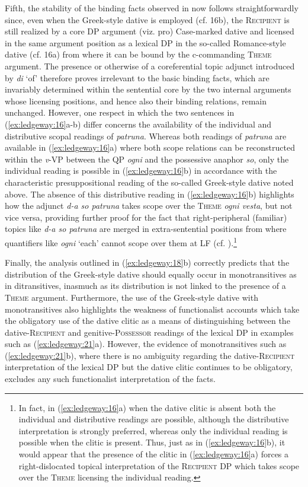 \documentclass[output=paper,modfonts,nonflat,colorlinks,citecolor=brown]{langsci/langscibook}
\begin{document}
  Fifth, the stability of the binding facts observed in  now follows straightforwardly since, even when the Greek-style dative is employed (cf. 16b), the \textsc{Recipient} is still realized by a core DP argument (viz. pro) Case-marked dative and licensed in the same argument position as a lexical DP in the so-called Romance-style dative (cf. 16a) from where it can be bound by the c-commanding \textsc{Theme} argument. The presence or otherwise of a coreferential topic adjunct introduced by \textit{di} ‘of’ therefore proves irrelevant to the basic binding facts, which are invariably determined within the sentential core by the two internal arguments whose licensing positions, and hence also their binding relations, remain unchanged. However, one respect in which the two sentences in (\ref{ex:ledgeway:16}a-b) differ concerns the availability of the individual and distributive scopal readings of \textit{patruna}. Whereas both readings of \textit{patruna} are available in (\ref{ex:ledgeway:16}a) where both scope relations can be reconstructed within the \textit{v}{}-VP between the QP \textit{ogni} and the possessive anaphor \textit{so}, only the individual reading is possible in (\ref{ex:ledgeway:16}b) in accordance with the characteristic presuppositional reading of the so-called Greek-style dative noted above. The absence of this distributive reading in (\ref{ex:ledgeway:16}b) highlights how the adjunct \textit{d-a so patruna} takes scope over the \textsc{Theme} \textit{ogni vesta}, but not vice versa, providing further proof for the fact that right-peripheral (familiar) topics like \textit{d-a so patruna} are merged in extra-sentential positions from where quantifiers like \textit{ogni} ‘each’ cannot scope over them at LF (cf. \citealt{Cardinaletti2002, Frascarelli2004, FrascarelliHinterhölzl2007}).\footnote{In fact, in (\ref{ex:ledgeway:16}a) when the dative clitic is absent both the individual and distributive readings are possible, although the distributive interpretation is strongly preferred, whereas only the individual reading is possible when the clitic is present. Thus, just as in (\ref{ex:ledgeway:16}b), it would appear that the presence of the clitic in (\ref{ex:ledgeway:16}a) forces a right-dislocated topical interpretation of the \textsc{Recipient} DP which takes scope over the \textsc{Theme} licensing the individual reading.}

  Finally, the analysis outlined in (\ref{ex:ledgeway:18}b) correctly predicts that the distribution of the Greek-style dative should equally occur in monotransitives as in ditransitives, inasmuch as its distribution is not linked to the presence of a \textsc{Theme} argument. Furthermore, the use of the Greek-style dative with monotransitives also highlights the weakness of functionalist accounts which take the obligatory use of the dative clitic as a means of distinguishing between the dative-\textsc{Recipient} and genitive-\textsc{Possessor} readings of the lexical DP in examples such as (\ref{ex:ledgeway:21}a). However, the evidence of monotransitives such as (\ref{ex:ledgeway:21}b), where there is no ambiguity regarding the dative-\textsc{Recipient} interpretation of the lexical DP but the dative clitic continues to be obligatory, excludes any such functionalist interpretation of the facts.
\end{document}
